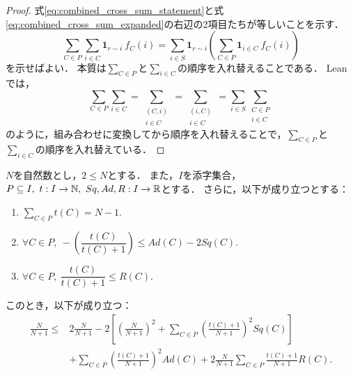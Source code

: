 \begin{proof}
  式\eqref{eq:combined_cross_sum_statement}と式\eqref{eq:combined_cross_sum_expanded}の右辺の2項目たちが等しいことを示す．
  \begin{equation}
    \sum_{C \in P} \sum_{i \in C} \bm{1}_{r \sim i}\ f_C(i)
    = \sum_{i \in S} \bm{1}_{r \sim i} \left( \sum_{C \in P} \bm{1}_{i \in C}\ f_C(i) \right)
  \end{equation}
  を示せばよい．
  本質は$\sum_{C \in P}$と$\sum_{i \in C}$の順序を入れ替えることである．
  Leanでは，
  \begin{equation}
    \sum_{C \in P} \sum_{i \in C}
    = \sum_{\substack{(C, i) \\ i \in C}}
    = \sum_{\substack{(i, C) \\ i \in C}}
    = \sum_{i \in S} \sum_{\substack{C \in P \\ i \in C}}
  \end{equation}
  のように，組み合わせに変換してから順序を入れ替えることで，$\sum_{C \in P}$と$\sum_{i \in C}$の順序を入れ替えている．
\end{proof}

\begin{lemma}
  \label{lem:energy_scalar}
  \leanok
  \uses{}
  $N$を自然数とし，$2 \le N$とする．
  また，$I$を添字集合，$P \subseteq I,\ t : I \rightarrow \mathbb{N},\ Sq, Ad, R : I \rightarrow \mathbb{R}$とする．
  さらに，以下が成り立つとする：
  \begin{enumerate}[label = (\roman*)]
    \item $\displaystyle \sum_{C \in P} t(C) = N - 1.$
    \item $\forall C \in P,\ -\left(\dfrac{t(C)}{t(C) + 1}\right) \le Ad(C) - 2 Sq(C).$
    \item $\forall C \in P,\ \dfrac{t(C)}{t(C) + 1} \le R(C).$
  \end{enumerate}
  このとき，以下が成り立つ：
  \begin{equation}
    \begin{split}
      \frac{N}{N + 1}
      \le{} & 2 \frac{N}{N + 1}
      - 2 \left[ \left( \frac{N}{N + 1} \right) ^ 2 + \sum_{C \in P} \left( \frac{t(C) + 1}{N + 1} \right) ^ 2 Sq(C) \right] \\
      & + \sum_{C \in P} \left( \frac{t(C) + 1}{N + 1} \right) ^ 2 Ad(C) + 2 \frac{N}{N + 1} \sum_{C \in P} \frac{t(C) + 1}{N + 1} R(C).
    \end{split}
  \end{equation}
\end{lemma}

